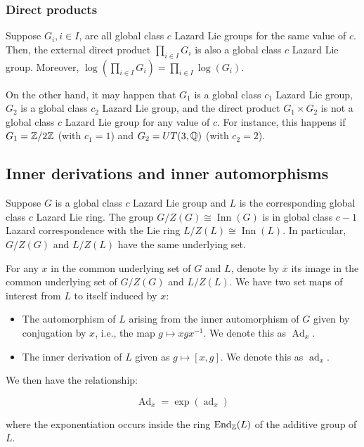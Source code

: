 \subsubsection{Direct products}

Suppose $G_i, i \in I$, are all global class $c$ Lazard Lie groups for
the same value of $c$. Then, the external direct product $\prod_{i \in
  I} G_i$ is also a global class $c$ Lazard Lie group. Moreover,
$\log(\prod_{i \in I} G_i) = \prod_{i \in I} \log(G_i)$.

On the other hand, it may happen that $G_1$ is a global class $c_1$
Lazard Lie group, $G_2$ is a global class $c_2$ Lazard Lie group, and
the direct product $G_1 \times G_2$ is not a global class $c$ Lazard
Lie group for any value of $c$. For instance, this happens if $G_1 =
\mathbb{Z}/2\mathbb{Z}$ (with $c_1 = 1$) and $G_2 = UT(3,\mathbb{Q})$ (with $c_2 = 2$).

\subsection{Inner derivations and inner automorphisms}\label{sec:lazard-adjoint}

Suppose $G$ is a global class $c$ Lazard Lie group and $L$ is the
corresponding global class $c$ Lazard Lie ring. The group $G/Z(G)
\cong \operatorname{Inn}(G)$ is in global class $c - 1$ Lazard
correspondence with the Lie ring $L/Z(L) \cong
\operatorname{Inn}(L)$. In particular, $G/Z(G)$ and $L/Z(L)$ have the
same underlying set.

For any $x$ in the common underlying set of $G$ and $L$, denote by
$\overline{x}$ its image in the common underlying set of $G/Z(G)$ and
$L/Z(L)$. We have two set maps of interest from $L$ to itself induced
by $x$:

\begin{itemize}
\item The automorphism of $L$ arising from the inner automorphism of
  $G$ given by conjugation by $x$, i.e., the map $g \mapsto
  xgx^{-1}$. We denote this as $\operatorname{Ad}_x$.
\item The inner derivation of $L$ given as $g \mapsto [x,g]$. We
  denote this as $\operatorname{ad}_x$.
\end{itemize}

We then have the relationship:

$$\operatorname{Ad}_x = \exp(\operatorname{ad}_x)$$

where the exponentiation occurs inside the ring
$\operatorname{End}_{\mathbb{Z}}(L)$ of the additive group of $L$.

